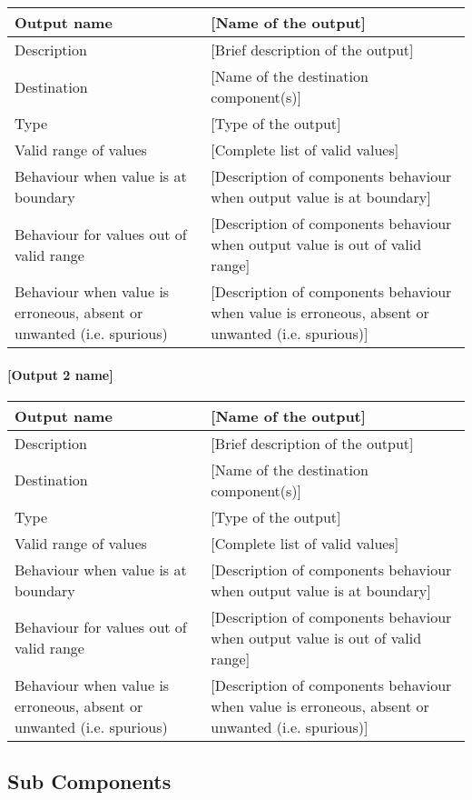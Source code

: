 \begin{longtable}{p{}p{}}
\toprule
Output name				& [Name of the output] \\
\midrule
Description				& [Brief description of the output] \\
\midrule
Destination				& [Name of the destination component(s)] \\ 
\midrule
Type					& [Type of the output] \\
\midrule
Valid range of values	& [Complete list of valid values] \\
\midrule
Behaviour when value is at boundary	& [Description of components behaviour when output value is at boundary] \\
\midrule
Behaviour for values out of valid range	& [Description of components behaviour when output value is out of valid range] \\
\midrule
Behaviour when value is erroneous, absent or unwanted (i.e. spurious) & [Description of components behaviour when value is erroneous, absent or unwanted (i.e. spurious)] \\
\bottomrule
\end{longtable}


\paragraph{[Output 2 name]}

\begin{longtable}{p{}p{}}
\toprule
Output name				& [Name of the output] \\
\midrule
Description				& [Brief description of the output] \\
\midrule
Destination				& [Name of the destination component(s)] \\ 
\midrule
Type					& [Type of the output] \\
\midrule
Valid range of values	& [Complete list of valid values] \\
\midrule
Behaviour when value is at boundary	& [Description of components behaviour when output value is at boundary] \\
\midrule
Behaviour for values out of valid range	& [Description of components behaviour when output value is out of valid range] \\
\midrule
Behaviour when value is erroneous, absent or unwanted (i.e. spurious) & [Description of components behaviour when value is erroneous, absent or unwanted (i.e. spurious)] \\
\bottomrule
\end{longtable}


\subsection{Sub Components}\label{s:manage_track_data_subcomponents}

%

%


